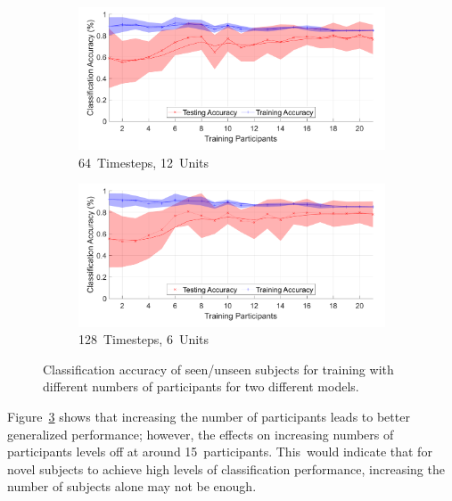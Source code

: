 \begin{figure}[!hbt]
    \centering
    \begin{subfigure}[H]{0.49\textwidth}
         \centering
        \includegraphics[width=\textwidth]{content/4-LSTM_Behaviour/results/number_participants_64x12.pdf}
        \caption{64~Timesteps, 12~Units}
        \label{fig:subject_num_generalisation_64x12}
    \end{subfigure}
    \hfil
    \begin{subfigure}[H]{0.49\textwidth}
         \centering
        \includegraphics[width=\textwidth]{content/4-LSTM_Behaviour/results/number_participants_128x6.pdf}
        \caption{128~Timesteps, 6~Units}
        \label{fig:subject_num_generalisation_128x6}
    \end{subfigure}
    \caption{Classification accuracy of seen/unseen subjects for training with different numbers of participants for two different models.}
    \label{fig:subject_num_generalisation}
\end{figure}


Figure~\ref{fig:subject_num_generalisation} shows that increasing the number of participants leads to better generalized performance; however, the effects on increasing numbers of participants levels off at around 15~participants. This~would indicate that for novel subjects to achieve high levels of classification performance, increasing the number of subjects alone may not be enough.

